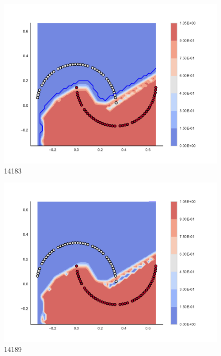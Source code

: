 \begin{subfigure}[b]{0.09\textwidth}
    \includegraphics[clip, trim=2.35cm 1.75cm 4.5cm 0cm,width=\textwidth]{img/convergence/14183.pdf}
    \caption{14183}
    \label{fig:convergence_14183}
\end{subfigure}
%
\begin{subfigure}[b]{0.09\textwidth}
    \includegraphics[clip, trim=2.35cm 1.75cm 4.5cm 0cm,width=\textwidth]{img/convergence/14189.pdf}
    \caption{14189}
    \label{fig:convergence_14189}
\end{subfigure}
%
